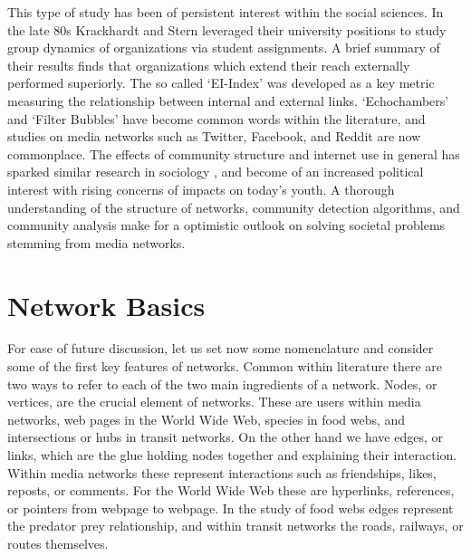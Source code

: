 \documentclass[a4paper, 10pt, twocolumn]{article}
\begin{document}
This type of study has been of persistent interest within the social sciences.
In the late 80s Krackhardt and Stern \cite{inet_crises} leveraged their university positions to study group dynamics of organizations via student assignments.
A brief summary of their results finds that organizations which extend their reach externally performed superiorly.
The so called `EI-Index' was developed as a key metric measuring the relationship between internal and external links.
`Echochambers' and `Filter Bubbles' have become common words within the literature, and studies on media networks such as Twitter, Facebook, and Reddit \cite{eko_weko, sm_ece, ekoin_ekobtwin} are now commonplace.
The effects of community structure and internet use in general has sparked similar research in sociology \cite{antisocial, eko_and_episteme, conspiracies_online, captivating}, and become of an increased political interest with rising concerns of impacts on today's youth.
A thorough understanding of the structure of networks, community detection algorithms, and community analysis make for a optimistic outlook on solving societal problems stemming from media networks.


\section{Network Basics}

For ease of future discussion, let us set now some nomenclature and consider some of the first key features of networks.
Common within literature there are two ways to refer to each of the two main ingredients of a network.
Nodes, or vertices, are the crucial element of networks.
These are users within media networks, web pages in the World Wide Web, species in food webs, and intersections or hubs in transit networks.
On the other hand we have edges, or links, which are the glue holding nodes together and explaining their interaction.
Within media networks these represent interactions such as friendships, likes, reposts, or comments.
For the World Wide Web these are hyperlinks, references, or pointers from webpage to webpage.
In the study of food webs edges represent the predator prey relationship, and within transit networks the roads, railways, or routes themselves.
\end{document}
